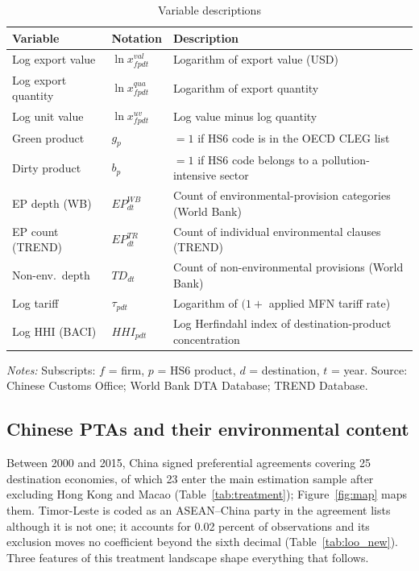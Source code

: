 \documentclass[12pt]{article}
\begin{document}
\begin{table}[htbp]
\centering
\caption{Variable descriptions}
\label{tab:vardesc}
\small
\begin{threeparttable}
\begin{tabular}{lll}
\toprule
Variable & Notation & Description \\
\midrule
Log export value & $\ln x^{val}_{fpdt}$ & Logarithm of export value (USD) \\
Log export quantity & $\ln x^{qua}_{fpdt}$ & Logarithm of export quantity \\
Log unit value & $\ln x^{uv}_{fpdt}$ & Log value minus log quantity \\
Green product & $g_p$ & $=1$ if HS6 code is in the OECD CLEG list \\
Dirty product & $b_p$ & $=1$ if HS6 code belongs to a pollution-intensive sector \\
EP depth (WB) & $EP^{WB}_{dt}$ & Count of environmental-provision categories (World Bank) \\
EP count (TREND) & $EP^{TR}_{dt}$ & Count of individual environmental clauses (TREND) \\
Non-env.\ depth & $TD_{dt}$ & Count of non-environmental provisions (World Bank) \\
Log tariff & $\tau_{pdt}$ & Logarithm of $(1 +$ applied MFN tariff rate) \\
Log HHI (BACI) & $HHI_{pdt}$ & Log Herfindahl index of destination-product concentration \\
\bottomrule
\end{tabular}
\begin{tablenotes}\footnotesize
\item \emph{Notes:} Subscripts: $f$ = firm, $p$ = HS6 product, $d$ = destination, $t$ = year. Source: Chinese Customs Office; World Bank DTA Database; TREND Database.
\end{tablenotes}
\end{threeparttable}
\end{table}

\subsection{Chinese PTAs and their environmental content}

Between 2000 and 2015, China signed preferential agreements covering 25 destination
economies, of which 23 enter the main estimation sample after excluding Hong Kong and
Macao (Table~\ref{tab:treatment}); Figure~\ref{fig:map} maps them. Timor-Leste is coded as an
ASEAN--China party in the agreement lists although it is not one; it accounts for 0.02 percent of
observations and its exclusion moves no coefficient beyond the sixth decimal
(Table~\ref{tab:loo_new}). Three features of this treatment landscape
shape everything that follows.
\end{document}
